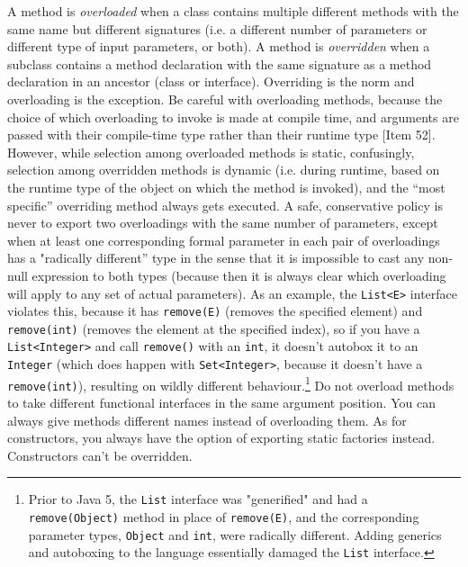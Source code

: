 \documentclass[table, xcdraw]{article}%
\begin{document}
A method is \emph{overloaded} when a class contains multiple different methods with the same name but different signatures (i.e. a different number of parameters or different type of input parameters, or both). A method is \emph{overridden} when a subclass contains a method declaration with the same signature as a method declaration in an ancestor (class or interface). Overriding is the norm and overloading is the exception. Be careful with overloading methods, because the choice of which overloading to invoke is made at compile time, and arguments are passed with their compile-time type rather than their runtime type [Item 52]. However, while selection among overloaded methods is static, confusingly, selection among overridden methods is dynamic (i.e. during runtime, based on the runtime type of the object on which the method is invoked), and the “most specific” overriding method always gets executed. A safe, conservative policy is never to export two overloadings with the same number of parameters, except when at least one corresponding formal parameter in each pair of overloadings has a "radically different” type in the sense that it is impossible to cast any non-null expression to both types (because then it is always clear which overloading will apply to any set of actual parameters). As an example, the \texttt{List<E>} interface violates this, because it has \texttt{remove(E)} (removes the specified element) and \texttt{remove(int)} (removes the element at the specified index), so if you have a \texttt{List<Integer>} and call \texttt{remove()} with an \texttt{int}, it doesn't autobox it to an \texttt{Integer} (which does happen with \texttt{Set<Integer>}, because it doesn't have a \texttt{remove(int)}), resulting on wildly different behaviour.\footnote{Prior to Java 5, the \texttt{List} interface was "generified" and had a \texttt{remove(Object)} method in place of \texttt{remove(E)}, and the corresponding parameter types, \texttt{Object} and \texttt{int}, were radically different. Adding generics and autoboxing to the language essentially damaged the \texttt{List} interface.} Do not overload methods to take different functional interfaces in the same argument position. You can always give methods different names instead of overloading them. As for constructors, you always have the option of exporting static factories instead. Constructors can't be overridden.
\end{document}
